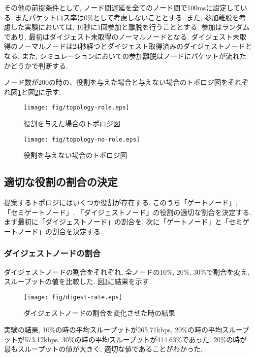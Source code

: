 その他の前提条件として, ノード間遅延を全てのノード間で100msに設定している. またパケットロス率は0\%として考慮しないこととする. また, 参加離脱を考慮した実験においては, 10秒に1回参加と離脱を行うこととする. 参加はランダムであり, 最初はダイジェスト未取得のノーマルノードとなる. ダイジェスト未取得のノーマルノードは24秒経つとダイジェスト取得済みのダイジェストノードとなる. また, シミュレーションにおいての参加離脱はノードにパケットが流れたかどうかで判断する.

ノード数が200の時の、役割を与えた場合と与えない場合のトポロジ図をそれぞれ図\ref{fig:topology-role}と図\ref{fig:topology-no-role}に示す.

\newpage

\begin{figure}[h]
  \centering
  \texttt{[image: fig/topology-role.eps]}
  \caption{役割を与えた場合のトポロジ図}
  \label{fig:topology-role}
\end{figure}

\newpage

\begin{figure}[h]
  \centering
  \texttt{[image: fig/topology-no-role.eps]}
  \caption{役割を与えない場合のトポロジ図}
  \label{fig:topology-no-role}
\end{figure}

\newpage

\subsection{適切な役割の割合の決定}
提案するトポロジにはいくつか役割が存在する. このうち「ゲートノード」, 「セミゲートノード」, 「ダイジェストノード」の役割の適切な割合を決定する. まず最初に「ダイジェストノード」の割合を, 次に「ゲートノード」と「セミゲートノード」の割合を決定する.

\subsubsection{ダイジェストノードの割合}
ダイジェストノードの割合をそれぞれ, 全ノードの10\%, 20\%, 30\%で割合を変え, スループットの値を比較した. 図\ref{fig:digest-rate}に結果を示す.

\begin{figure}[h]
  \centering
  \texttt{[image: fig/digest-rate.eps]}
  \caption{ダイジェストノードの割合を変化させた時の結果}
  \label{fig:digest-rate}
\end{figure}

実験の結果, 10\%の時の平均スループットが265.71kbps, 20\%の時の平均スループットが573.12kbps, 30\%の時の平均スループットが414.63\%であった. 20\%の時が最もスループットの値が大きく, 適切な値であることがわかった.

